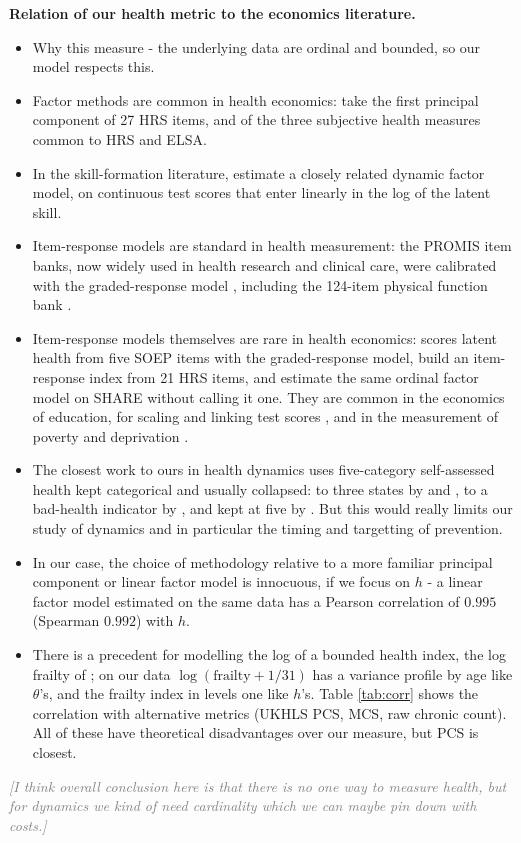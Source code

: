\documentclass[11pt]{article}
\newcommand{\note}[1]{\textcolor{gray}{\textit{[#1]}}}
\begin{document}
	\textbf{Relation of our health metric to the economics literature.}
	\begin{itemize}
		\item Why this measure - the underlying data are ordinal and bounded, so our model respects this.
		\item Factor methods are common in health economics: \citet{poterba2013,poterba2017} take the first principal component of 27 HRS items, and \citet{blundell2023} of the three subjective health measures common to HRS and ELSA.
		\item In the skill-formation literature, \citet{cunha2010} estimate a closely related dynamic factor model, on continuous test scores that enter linearly in the log of the latent skill.
		\item Item-response models are standard in health measurement: the PROMIS item banks, now widely used in health research and clinical care, were calibrated with the graded-response model \citep{cella2010}, including the 124-item physical function bank \citep{rose2014}.
		\item Item-response models themselves are rare in health economics: \citet{graeber2023} scores latent health from five SOEP items with the graded-response model, \citet{wallace2017} build an item-response index from 21 HRS items, and \citet{meijer2011} estimate the same ordinal factor model on SHARE without calling it one. They are common in the economics of education, for scaling and linking test scores \citep{dashammer2005,daszajonc2010,singh2015,muralidharan2019,jacob2016}, and in the measurement of poverty and deprivation \citep{moffitt2016,corsini2020,farcomeni2025,davis2026}.
		\item The closest work to ours in health dynamics uses five-category self-assessed health kept categorical and usually collapsed: to three states by \citet{denardi2025} and \citet{capatina2015}, to a bad-health indicator by \citet{halliday2008}, and kept at five by \citet{contoyannis2004}. But this would really limits our study of dynamics and in particular the timing and targetting of prevention. 
		\item In our case, the choice of methodology relative to a more familiar principal component or linear factor model is innocuous, if we focus on $h$ - a linear factor model estimated on the same data has a Pearson correlation of $0.995$ (Spearman $0.992$) with $h$.
		\item There is a precedent for modelling the log of a bounded health index, the log frailty of \citet{hosseini2022}; on our data $\log(\text{frailty}+1/31)$ has a variance profile by age like $\theta$'s, and the frailty index in levels one like $h$'s.
		Table \ref{tab:corr} shows the correlation with alternative metrics (UKHLS PCS, MCS, raw chronic count). All of these have theoretical disadvantages over our measure, but PCS is closest.
	\end{itemize}
	\note{I think overall conclusion here is that there is no one way to measure health, but for dynamics we kind of need cardinality which we can maybe pin down with costs.} 
	
\end{document}
